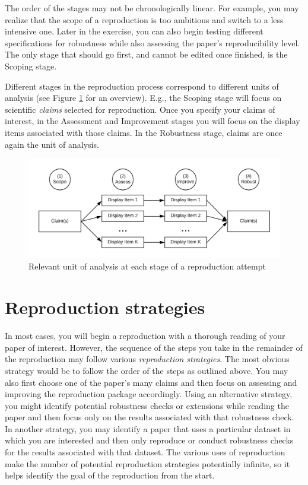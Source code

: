 \documentclass[
]{book}
\begin{document}
The order of the stages may not be chronologically linear. For example, you may realize that the scope of a reproduction is too ambitious and switch to a less intensive one. Later in the exercise, you can also begin testing different specifications for robustness while also assessing the paper's reproducibility level. The only stage that should go first, and cannot be edited once finished, is the Scoping stage.

Different stages in the reproduction process correspond to different units of analysis (see Figure \ref{fig:stages-unit} for an overview). E.g., the Scoping stage will focus on scientific \emph{claims} selected for reproduction. Once you specify your claims of interest, in the Assessment and Improvement stages you will focus on the display items associated with those claims. In the Robustness stage, claims are once again the unit of analysis.

\begin{figure}
\includegraphics[width=1\linewidth]{unit-of-analysis} \caption{Relevant unit of analysis at each stage of a reproduction attempt}\label{fig:stages-unit}
\end{figure}

\hypertarget{reproduction-strategies}{%
\section*{Reproduction strategies}\label{reproduction-strategies}}

In most cases, you will begin a reproduction with a thorough reading of your paper of interest. However, the sequence of the steps you take in the remainder of the reproduction may follow various \emph{reproduction strategies}. The most obvious strategy would be to follow the order of the steps as outlined above. You may also first choose one of the paper's many claims and then focus on assessing and improving the reproduction package accordingly. Using an alternative strategy, you might identify potential robustness checks or extensions while reading the paper and then focus only on the results associated with that robustness check. In another strategy, you may identify a paper that uses a particular dataset in which you are interested and then only reproduce or conduct robustness checks for the results associated with that dataset. The various uses of reproduction make the number of potential reproduction strategies potentially infinite, so it helps identify the goal of the reproduction from the start.
\end{document}
